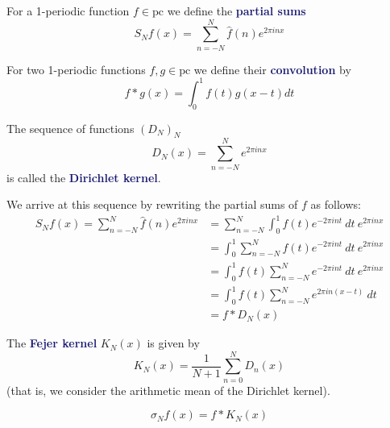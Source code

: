\documentclass[11pt]{article}
\numberwithin{equation}{section}
\newcommand{\navy}[1]{\textcolor{MidnightBlue}{\bf #1}}
\theoremstyle{definition}
\theoremstyle{definition}
\newcommand{\1}{\mathbbm 1}
\begin{document}
\begin{definition}
	For a 1-periodic function $f \in \text{pc}$ we define the \navy{partial sums} 
	\begin{equation}
		S_Nf(x) = \sum_{n=-N}^N \hat{f}(n) e^{2\pi i nx}
	\end{equation}
\end{definition}

\begin{definition}[Convolution]
	For two 1-periodic functions $f,g \in \text{pc}$ we define their \navy{convolution} by
	\begin{equation}
		f * g(x) = \int_0^1 f(t)g(x-t)dt
	\end{equation}
\end{definition}

\begin{definition}
	The sequence of functions $(D_N)_N$
	\begin{equation}
		D_N(x) = \sum_{n=-N}^N e^{2 \pi i n x}
	\end{equation}
	is called the \navy{Dirichlet kernel}. 
\end{definition}

We arrive at this sequence by rewriting the partial sums of $f$ as follows:
\begin{align*}
	S_Nf(x) = \sum_{n=-N}^N \hat{f}(n) e^{2\pi i nx} &= \sum_{n=-N}^N \int_0^1 f(t) e^{-2 \pi i n t} \ dt \ e^{2\pi i nx} \tag{substitute def of fourier coefficent} \\
	&= \int_0^1 \sum_{n=-N}^N f(t) e^{-2 \pi i n t} \ dt \ e^{2\pi i nx} \tag{exchange sum and integral} \\
	&= \int_0^1 f(t) \sum_{n=-N}^N e^{-2 \pi i n t} \ dt \ e^{2\pi i nx} \\
	&= \int_0^1 f(t) \sum_{n=-N}^N e^{2 \pi i n (x-t)} \ dt \\
	&= f * D_N(x)
\end{align*}

\begin{definition}
	The \navy{Fejer kernel} $K_N(x)$ is given by
	\begin{equation}
		K_N(x) = \frac{1}{N+1} \sum_{n=0}^N D_n(x) 	
	\end{equation} 
	(that is, we consider the arithmetic mean of the Dirichlet kernel). 
\end{definition}

\begin{definition}
	\begin{equation}
		\sigma_N f(x) = f * K_N(x)
	\end{equation}
\end{definition}
\end{document}
